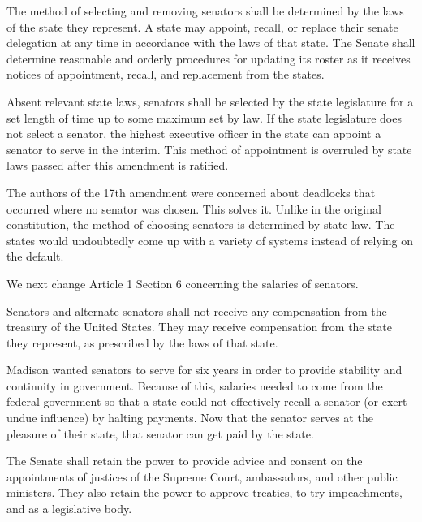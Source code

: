 \documentclass{article}
\begin{document}
\begin{quoting}
The method of selecting and removing senators shall be determined by the laws of the state they represent. A state may appoint, recall, or replace their senate delegation at any time in accordance with the laws of that state. The Senate shall determine reasonable and orderly procedures for updating its roster as it receives notices of appointment, recall, and replacement from the states.

Absent relevant state laws, senators shall be selected by the state legislature for a set length of time up to some maximum set by law. If the state legislature does not select a senator, the highest executive officer in the state can appoint a senator to serve in the interim. This method of appointment is overruled by state laws passed after this amendment is ratified.
\end{quoting}

The authors of the 17th amendment were concerned about deadlocks that occurred where no senator was chosen. This solves it. Unlike in the original constitution, the method of choosing senators is determined by state law. The states would undoubtedly come up with a variety of systems instead of relying on the default.

We next change Article 1 Section 6 concerning the salaries of senators.

\begin{quoting}
Senators and alternate senators shall not receive any compensation from the treasury of the United States. They may receive compensation from the state they represent, as prescribed by the laws of that state.
\end{quoting}

Madison wanted senators to serve for six years in order to provide stability and continuity in government\cite{Senate}. Because of this, salaries needed to come from the federal government so that a state could not effectively recall a senator (or exert undue influence) by halting payments. Now that the senator serves at the pleasure of their state, that senator can get paid by the state.

\begin{quoting}
The Senate shall retain the power to provide advice and consent on the appointments of justices of the Supreme Court, ambassadors, and other public ministers. They also retain the power to approve treaties, to try impeachments, and as a legislative body.
\end{quoting}
\end{document}
